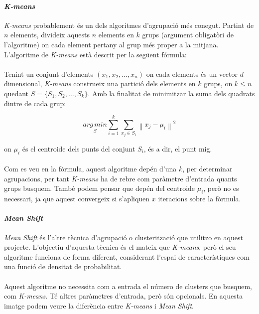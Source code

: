 \documentclass[12pt,a4paper,catalan]{article}
\begin{document}
\paragraph{\textit{K-means}}
\textit{K-means} \cite{k-means} probablement és un dels algoritmes d'agrupació més conegut. Partint de $n$ elements, divideix aquests $n$ elements en $k$ grups (argument obligatòri de l'algoritme) on cada element pertany al grup més proper a la mitjana. L'algoritme de \textit{K-means} està descrit per la següent fórmula:
\\
\\
Tenint un conjunt d'elements $(x_1, x_2, \ldots, x_n)$ on cada elements és un vector $d$ dimensional, \textit{K-means} construeix una partició dels elements en $k$ grups, on $k \leq n$ quedant $S = \{S_1, S_2, \ldots, S_k\}$. Amb la finalitat de minimitzar la suma dels quadrats dintre de cada grup:

$$ \underset{S} {arg\,min} \sum_{i=1}^{k} \sum_{x_j \in S_i} \left\| x_j - \mu_i \right\|^2 $$

on $\mu_i$ és el centroide dels punts del conjunt $S_i$, és a dir, el punt mig.
\\
\\
Com es veu en la fòrmula, aquest algoritme depén d'una $k$, per determinar agrupacions, per tant \textit{K-means} ha de rebre com paràmetre d'entrada quants grups busquem. També podem pensar que depén del centroide $\mu_i$, però no es necessari, ja que aquest convergeix si s'apliquen $x$ iteracions sobre la fòrmula.

\newpage

\paragraph{\textit{Mean Shift}}
\textit{Mean Shift} \cite{mean-shift} és l'altre tècnica d'agrupació o clusterització que utilitzo en aquest projecte. L'objectiu d'aquesta tècnica és el mateix que \textit{K-means}, però el seu algoritme funciona de forma diferent, considerant l'espai de característiques com una funció de densitat de probabilitat.
\\
\\
Aquest algoritme no necessita com a entrada el número de clusters que busquem, com \textit{K-means}. Té altres paràmetres d'entrada, però són opcionals. En aquesta imatge podem veure la diferència entre \textit{K-means} i \textit{Mean Shift}.
\end{document}
